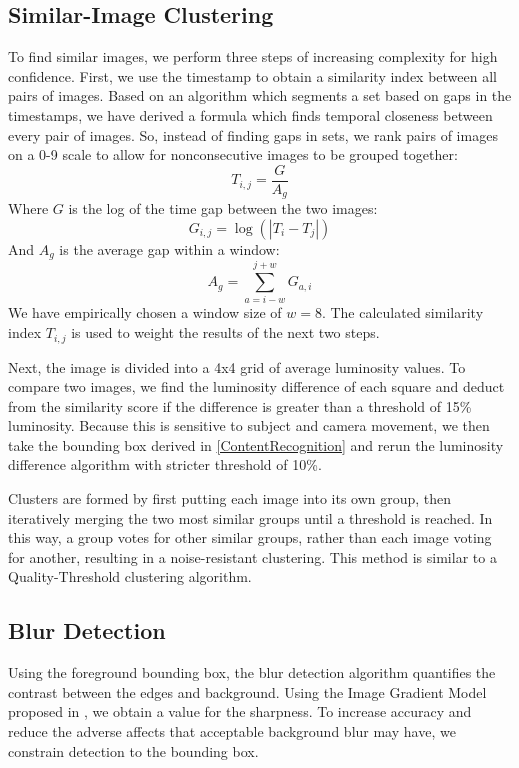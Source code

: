\documentclass{article}
\begin{document}
\subsection{Similar-Image Clustering}
To find similar images, we perform three steps of increasing complexity for high confidence.
First, we use the timestamp to obtain a similarity index between all pairs of images. Based on an algorithm which segments a set based on gaps in the timestamps\cite{1292402}, we have derived a formula which finds temporal closeness between every pair of images. So, instead of finding gaps in sets, we rank pairs of images on a 0-9 scale to allow for nonconsecutive images to be grouped together:
\[
T_{i,j}=\frac{G}{A_g}
\]
Where \(G\) is the log of the time gap between the two images:
\[
G_{i,j}=\log(|T_i-T_j|)
\]
And \(A_g\) is the average gap within a window:
\[
A_g=\displaystyle\sum\limits_{a={i-w}}^{j+w}G_{a,i}
\]
We have empirically chosen a window size of \(w=8\).
The calculated similarity index \(T_{i,j}\) is used to weight the results of the next two steps.

Next, the image is divided into a 4x4 grid of average luminosity values. To compare two images, we find the luminosity difference of each square and deduct from the similarity score if the difference is greater than a threshold of 15\% luminosity. Because this is sensitive to subject and camera movement, we then take the bounding box derived in \ref{ContentRecognition} and rerun the luminosity difference algorithm with stricter threshold of 10\%.

Clusters are formed by first putting each image into its own group, then iteratively merging the two most similar groups until a threshold is reached. In this way, a group votes for other similar groups, rather than each image voting for another, resulting in a noise-resistant clustering. This method is similar to a Quality-Threshold clustering algorithm. %

\subsection{Blur Detection}
Using the foreground bounding box, the blur detection algorithm quantifies the contrast between the edges and background. Using the Image Gradient Model proposed in \cite{springerlink:10.1007/978-3-540-77409-9_26}, we obtain a value for the sharpness. To increase accuracy and reduce the adverse affects that acceptable background blur may have, we constrain detection to the bounding box.
\end{document}
